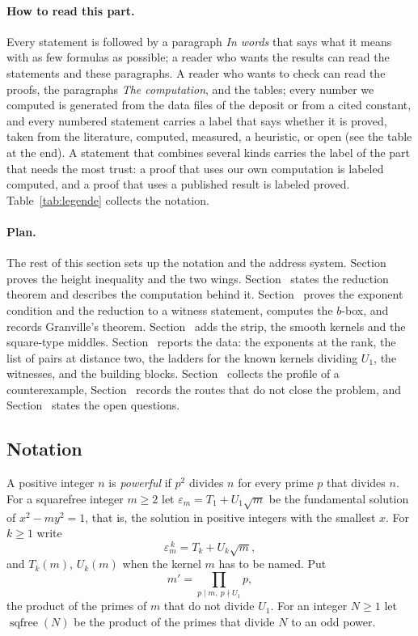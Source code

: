 \paragraph{How to read this part.} Every statement is followed by a paragraph \emph{In words} that says what it means with as few formulas
as possible; a reader who wants the results can read the statements and these paragraphs. A reader who wants to check can read the proofs,
the paragraphs \emph{The computation}, and the tables; every number we computed is generated from the data files of the deposit or from a
cited constant, and every
numbered statement carries a label that says whether it is proved, taken from the literature, computed, measured, a heuristic, or open (see
the table at the end). A statement that combines several kinds carries the label of the part that needs the most trust: a proof that uses our own computation is labeled computed, and a proof that uses a published result is labeled proved. Table~\ref{tab:legende} collects the notation.

\paragraph{Plan.} The rest of this section sets up the notation and the address system. Section~ proves the height
inequality and the two wings. Section~ states the reduction theorem and describes the computation behind it.
Section~ proves the exponent condition and the reduction to a witness statement, computes the $b$-box, and records Granville's
theorem. Section~ adds the strip, the smooth kernels and the square-type middles. Section~ reports the
data: the exponents at the rank, the list of pairs at distance two, the ladders for the known kernels dividing $U_1$, the witnesses, and the
building blocks. Section~ collects the profile of a counterexample, Section~ records the routes that do
not close the problem, and Section~ states the open questions.


\subsection{Notation}
A positive integer $n$ is \emph{powerful} if $p^2$ divides $n$ for every prime $p$ that divides $n$.
For a squarefree integer $m \ge 2$ let $\varepsilon_m = T_1 + U_1\sqrt{m}$ be the fundamental solution of $x^2 - m y^2 = 1$,
that is, the solution in positive integers with the smallest $x$. For $k \ge 1$ write
\[
  \varepsilon_m^{\,k} = T_k + U_k\sqrt{m},
\]
and $T_k(m)$, $U_k(m)$ when the kernel $m$ has to be named. Put
\[
  m' = \prod_{p \mid m,\ p \nmid U_1} p,
\]
the product of the primes of $m$ that do not divide $U_1$. For an integer $N \ge 1$ let $\operatorname{sqfree}(N)$ be the product of the
primes that divide $N$ to an odd power.

